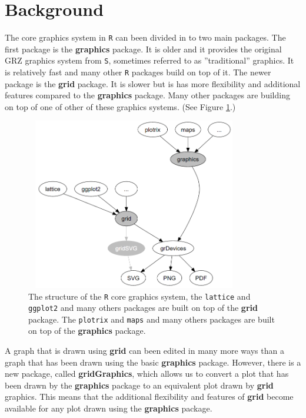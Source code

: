 \documentclass{report}
\begin{document}
\section{Background}
The core graphics system in \texttt{R} \citep{R2017} can been divided in to two main packages. The first package is the \textbf{graphics} package. It is older and it provides the original GRZ graphics system from \texttt{S}, sometimes referred to as ''traditional'' graphics. It is relatively fast and many other \texttt{R} packages build on top of it. The newer package is the \textbf{grid} package. It is slower but is has more flexibility and additional features compared to the \textbf{graphics} package. Many other packages are building on top of one of other of these graphics systems. (See Figure \ref{intro}.) \\

\begin{figure}[h]
	\begin{center}
		\includegraphics[height = 7.5cm, width = 9.5cm]{figure/intro.png}
		\caption{The structure of the \texttt{R} core graphics system, the \texttt{lattice} \citep{lattice}  and \texttt{ggplot2} \citep{ggplot2} and many others packages are built on top of the \textbf{grid} package. The \texttt{plotrix} \citep{plotrix} and \texttt{maps} \citep{maps} and many others packages are built on top of the \textbf{graphics} package. }
		\label{intro}
	\end{center}
\end{figure}

A graph that is drawn using \textbf{grid} can been edited in many more ways than a graph that has been drawn using the basic \textbf{graphics} package. However, there is a new package, called \textbf{gridGraphics}, which allows us to convert a plot that has been drawn by the \textbf{graphics} package to an equivalent plot drawn by \textbf{grid} graphics. This means that the additional flexibility and features of \textbf{grid} become available for any plot drawn using the \textbf{graphics} package. \\
\end{document}
